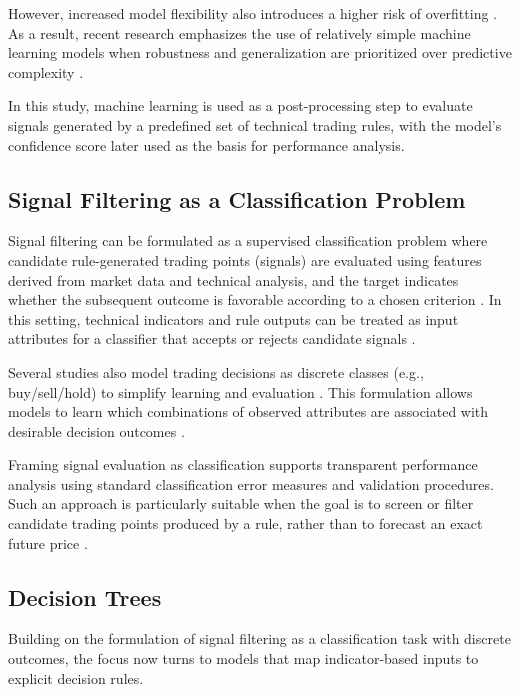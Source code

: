 However, increased model flexibility also introduces a higher risk of overfitting \citep{dietterich1995overfitting}.
As a result, recent research emphasizes the use of relatively simple machine learning models when robustness and generalization are prioritized over predictive complexity \citep{bu2020research}.

In this study, machine learning is used as a post-processing step to evaluate signals generated by a predefined set of technical trading rules, with the model’s confidence score later used as the basis for performance analysis.

\subsection{Signal Filtering as a Classification Problem}
\label{subsec:signal_filtering_classification}

Signal filtering can be formulated as a supervised classification problem where candidate rule-generated trading points (signals) are evaluated using features derived from market data and technical analysis, and the target indicates whether the subsequent outcome is favorable according to a chosen criterion \citep{wu2006decisiontree, teixeira2010knn}.
In this setting, technical indicators and rule outputs can be treated as input attributes for a classifier that accepts or rejects candidate signals \citep{wu2006decisiontree}.

Several studies also model trading decisions as discrete classes (e.g., buy/sell/hold) to simplify learning and evaluation \citep{alnasseri2015stocktwits}.
This formulation allows models to learn which combinations of observed attributes are associated with desirable decision outcomes \citep{alnasseri2015stocktwits, wu2006decisiontree}.

Framing signal evaluation as classification supports transparent performance analysis using standard classification error measures and validation procedures. Such an approach is particularly suitable when the goal is to screen or filter candidate trading points produced by a rule, rather than to forecast an exact future price \citep{wu2006decisiontree, alnasseri2015stocktwits}.


\subsection{Decision Trees}
\label{subsec:decision_trees}

Building on the formulation of signal filtering as a classification task with discrete outcomes, the focus now turns to models that map indicator-based inputs to explicit decision rules. 

